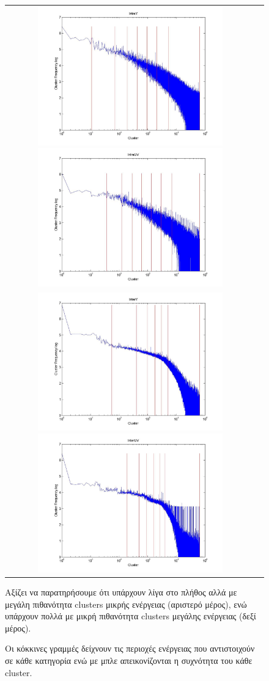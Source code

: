  \begin{figure}[h]
\centering
\begin{tabular}{c c}
    \includegraphics[height=6.0cm]{chapter4/IntraY.jpg}
    \includegraphics[height=6.0cm]{chapter4/IntraUV.jpg}\\
    \includegraphics[height=6.0cm]{chapter4/InterY.jpg}
    \includegraphics[height=6.0cm]{chapter4/InterUV.jpg}
\end{tabular}
\caption{Οι κόκκινες γραμμές δείχνουν τις περιοχές ενέργειας που αντιστοιχούν σε κάθε κατηγορία ενώ με μπλε απεικονίζονται η συχνότητα του κάθε cluster.} 
\indent Αξίζει να παρατηρήσουμε ότι υπάρχουν λίγα στο πλήθος αλλά με μεγάλη πιθανότητα clusters μικρής ενέργειας (αριστερό μέρος), ενώ υπάρχουν πολλά με μικρή πιθανότητα clusters μεγάλης ενέργειας (δεξί μέρος).

\label{fig:cat}
\end{figure}

